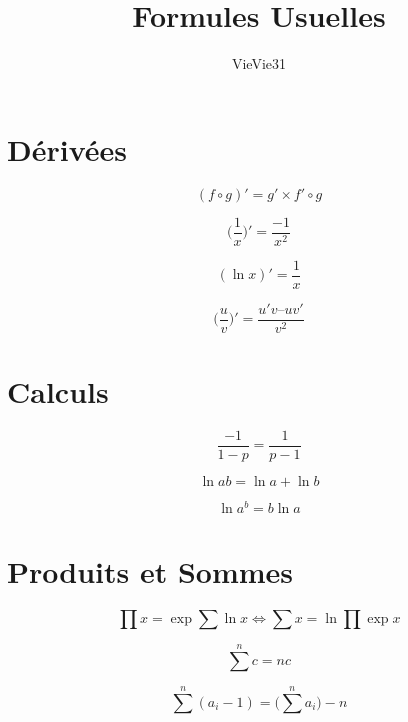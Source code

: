\documentclass{article}
\title{Formules Usuelles}
\author{VieVie31}
\begin{document}
\newtheorem{theo}{Théorème}
\newtheorem{coro}{Corollaire}

\maketitle

\section{Dérivées}

\begin{equation}
    (f \circ g)' = g' \times f' \circ g
\end{equation}

\begin{equation}
    \Big( \frac{1}{x} \Big)' = \frac{-1}{x^2} 
\end{equation}

\begin{equation}
    (\ln x)' = \frac{1}{x}
\end{equation}

\begin{equation}
    \Big( \frac{u}{v} \Big)' = \frac{{u'v} – {uv'}}{v^2}
\end{equation}

\section{Calculs}

\begin{equation}
    \frac{-1}{1 - p} = \frac{1}{p - 1}
\end{equation}

\begin{equation}
    \ln ab = \ln a + \ln b    
\end{equation}

\begin{equation}
    \ln a^b = b \ln a
\end{equation}



\section{Produits et Sommes}

\begin{equation}
    \prod x = \exp \sum \ln x
    \iff \sum x = \ln \prod \exp x
\end{equation}

\begin{equation}
    \sum \limits^n c = nc
\end{equation}

\begin{equation}
    \sum \limits^n (a_i - 1) = \Big( \sum \limits^n a_i \Big) -n
\end{equation}
\end{document}
